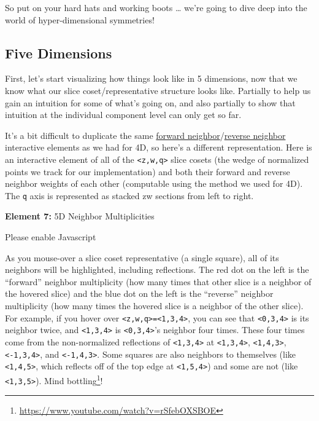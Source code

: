 \documentclass[]{article}
\renewcommand{\href}[2]{#2\footnote{\url{#1}}}
\begin{document}
So put on your hard hats and working boots \ldots{} we're going to dive deep
into the world of hyper-dimensional symmetries!

\hypertarget{five-dimensions}{%
\subsection{Five Dimensions}\label{five-dimensions}}

First, let's start visualizing how things look like in 5 dimensions, now that we
know what our slice coset/representative structure looks like. Partially to help
us gain an intuition for some of what's going on, and also partially to show
that intuition at the individual component level can only get so far.

It's a bit difficult to duplicate the same
\protect\hyperlink{golSyms4DForward}{forward
neighbor}/\protect\hyperlink{golSyms4DReverse}{reverse neighbor} interactive
elements as we had for 4D, so here's a different representation. Here is an
interactive element of all of the \texttt{\textless{}z,w,q\textgreater{}} slice
cosets (the wedge of normalized points we track for our implementation) and both
their forward and reverse neighbor weights of each other (computable using the
method we used for 4D). The \texttt{q} axis is represented as stacked zw
sections from left to right.

\leavevmode\hypertarget{golSyms5D}{}%
\textbf{Element 7:} 5D Neighbor Multiplicities

\leavevmode\hypertarget{golSyms5DCont}{}%
Please enable Javascript

As you mouse-over a slice coset representative (a single square), all of its
neighbors will be highlighted, including reflections. The red dot on the left is
the ``forward'' neighbor multiplicity (how many times that other slice is a
neighbor of the hovered slice) and the blue dot on the left is the ``reverse''
neighbor multiplicity (how many times the hovered slice is a neighbor of the
other slice). For example, if you hover over
\texttt{\textless{}z,w,q\textgreater{}=\textless{}1,3,4\textgreater{}}, you can
see that \texttt{\textless{}0,3,4\textgreater{}} is its neighbor twice, and
\texttt{\textless{}1,3,4\textgreater{}} is
\texttt{\textless{}0,3,4\textgreater{}}'s neighbor four times. These four times
come from the non-normalized reflections of
\texttt{\textless{}1,3,4\textgreater{}} at
\texttt{\textless{}1,3,4\textgreater{}},
\texttt{\textless{}1,4,3\textgreater{}},
\texttt{\textless{}-1,3,4\textgreater{}}, and
\texttt{\textless{}-1,4,3\textgreater{}}. Some squares are also neighbors to
themselves (like \texttt{\textless{}1,4,5\textgreater{}}, which reflects off of
the top edge at \texttt{\textless{}1,5,4\textgreater{}}) and some are not (like
\texttt{\textless{}1,3,5\textgreater{}}).
\href{https://www.youtube.com/watch?v=rSfebOXSBOE}{Mind bottling}!
\end{document}
